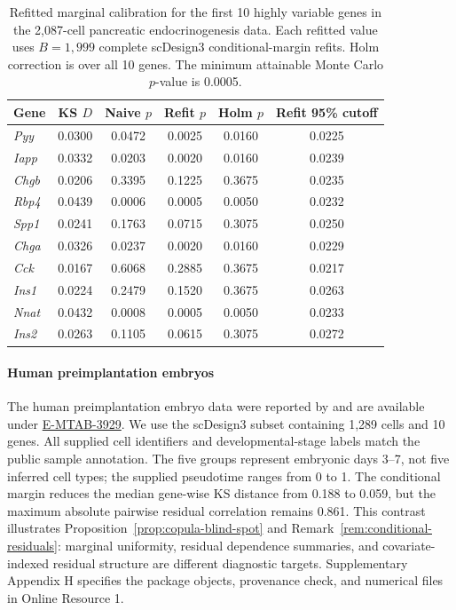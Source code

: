 \documentclass[preprint,12pt]{elsarticle}
\theoremstyle{plain}
\theoremstyle{remark}
\begin{document}
\begin{table}[!htbp]
\centering
\scriptsize
\caption{Refitted marginal calibration for the first 10 highly variable genes
in the 2,087-cell pancreatic endocrinogenesis data. Each refitted value uses
$B=1,999$ complete scDesign3 conditional-margin refits. Holm correction is
over all 10 genes. The minimum attainable Monte Carlo $p$-value is 0.0005.}
\label{tab:pancreas-refit}
\setlength{\tabcolsep}{5pt}
\begin{tabular}{@{}lccccc@{}}
\toprule
Gene & KS $D$ & Naive $p$ & Refit $p$ & Holm $p$ & Refit 95\% cutoff\\
\midrule
\textit{Pyy}  & 0.0300 & 0.0472 & 0.0025 & 0.0160 & 0.0225\\
\textit{Iapp} & 0.0332 & 0.0203 & 0.0020 & 0.0160 & 0.0239\\
\textit{Chgb} & 0.0206 & 0.3395 & 0.1225 & 0.3675 & 0.0235\\
\textit{Rbp4} & 0.0439 & 0.0006 & 0.0005 & 0.0050 & 0.0232\\
\textit{Spp1} & 0.0241 & 0.1763 & 0.0715 & 0.3075 & 0.0250\\
\textit{Chga} & 0.0326 & 0.0237 & 0.0020 & 0.0160 & 0.0229\\
\textit{Cck}  & 0.0167 & 0.6068 & 0.2885 & 0.3675 & 0.0217\\
\textit{Ins1} & 0.0224 & 0.2479 & 0.1520 & 0.3675 & 0.0263\\
\textit{Nnat} & 0.0432 & 0.0008 & 0.0005 & 0.0050 & 0.0233\\
\textit{Ins2} & 0.0263 & 0.1105 & 0.0615 & 0.3075 & 0.0272\\
\bottomrule
\end{tabular}
\end{table}

\paragraph{Human preimplantation embryos}
The human preimplantation embryo data were reported by
\citet{petropoulos2016embryos} and are available under
\href{https://www.ebi.ac.uk/biostudies/arrayexpress/studies/E-MTAB-3929}{E-MTAB-3929}.
We use the scDesign3 subset containing 1,289 cells and 10 genes.
All supplied cell identifiers and developmental-stage labels match the
public sample annotation. The five groups represent embryonic days 3--7,
not five inferred cell types; the supplied pseudotime ranges from 0 to 1.
The conditional margin reduces
the median gene-wise KS distance from 0.188 to 0.059, but the maximum absolute
pairwise residual correlation remains 0.861. This contrast illustrates
Proposition~\ref{prop:copula-blind-spot} and
Remark~\ref{rem:conditional-residuals}: marginal uniformity, residual
dependence summaries, and covariate-indexed residual structure are different
diagnostic targets. Supplementary Appendix H specifies the package objects,
provenance check, and numerical files in Online Resource 1.
\end{document}
